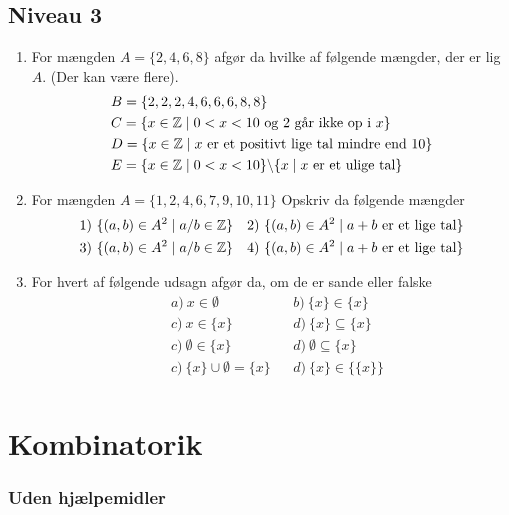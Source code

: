 \documentclass[12pt]{article}
\begin{document}
\subsection*{Niveau 3}
\begin{enumerate}[label=\roman*)]
	\item For mængden $A = \{2,4,6,8\}$ afgør da hvilke af følgende mængder, der er lig $A$. (Der kan være flere).
	\begin{align*}
		&B = \{2,2,2,4,6,6,6,8,8\} \\
		&C = \{x \in \mathbb{Z} \mid 0 < x < 10 \textnormal{ og 2 går ikke op i }x \}\\
		&D = \{x \in \mathbb{Z} \mid x \textnormal{ er et positivt lige tal mindre end 10}\} \\
		&E= \{x \in \mathbb{Z} \mid 0 < x < 10 \} \backslash \{x \mid x \textnormal{ er et ulige tal}\}
	\end{align*}	
	\item For mængden $A = \{1,2,4,6,7,9,10,11\}$ Opskriv da følgende mængder
	\begin{align*}
		&1) \ \{(a,b) \in A^2 \mid a/b \in \mathbb{Z}\}  & &2) \   \{(a,b) \in A^2 \mid a + b \textnormal{ er et lige tal}\} \\
		&3) \ \{(a,b) \in A^2 \mid a/b \in \mathbb{Z}\}  & &4) \   \{(a,b) \in A^2 \mid a + b \textnormal{ er et lige tal}\}
	\end{align*}
	\item For hvert af følgende udsagn afgør da, om de er sande eller falske 
	\begin{align*}
		&a) \ x \in \emptyset   &&b) \ \{x\} \in \{x\} \\
		&c) \ x \in \{x\}      &&d) \  \{x\} \subseteq \{x\} \\
		&c) \ \emptyset \in \{x\}      &&d) \  \emptyset \subseteq \{x\} \\
		&c) \ \{x\} \cup \emptyset = \{x\}      &&d) \  \{x\} \in \{\{x\}\} \\
	\end{align*}
\end{enumerate}

\newpage

\section*{Kombinatorik}

\subsubsection*{Uden hjælpemidler}
\end{document}
